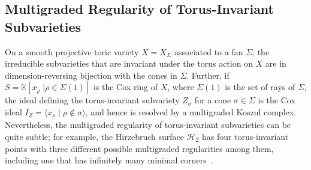 \documentclass[11pt,reqno]{amsart}
\theoremstyle{remark}
\newcommand{\KK}{\mathbb{K}}
\newcommand{\cH}{\mathcal{H}}
\newcommand{\cM}{\mathcal{M}}
\newcommand{\cO}{\mathcal{O}}
\newcommand{\juliette}[1]{{\color{red} \sf $\spadesuit\spadesuit\spadesuit$ Juliette: [#1]}}
\begin{document}
%

 \subsection{Multigraded Regularity of Torus-Invariant Subvarieties}
 
 On a smooth projective toric variety $X = X_{\Sigma}$ associated to a fan $\Sigma$, the irreducible subvarieties that are invariant under the torus action on $X$ are in dimension-reversing bijection with the cones in $\Sigma$. Further, if $S=\KK[x_{\rho} \; | \rho\in \Sigma(1)]$ is the Cox ring of $X$, where $\Sigma(1)$ is the set of rays of $\Sigma$, the ideal defining the torus-invariant subvariety $Z_{\sigma}$ for a cone $\sigma \in \Sigma$ is the Cox ideal $I_{Z} = \langle x_{\rho} \; | \; \rho \not\in \sigma \rangle$, and hence is resolved by a multigraded Koszul complex. Nevertheless, the multigraded regularity of torus-invariant subvarieties can be quite subtle; for example, the Hirzebruch surface $\cH_{2}$ has four torus-invariant points with three different possible multigraded regularities among them, including one that has infinitely many minimal corners~\cite{bruceHellerSayrafi22}. 
 
\end{document}
